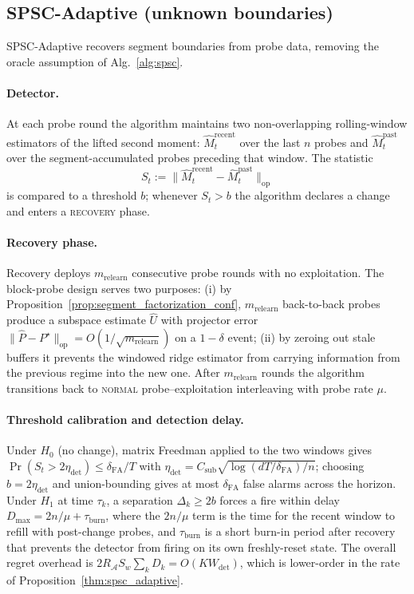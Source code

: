 \documentclass{article}
\newcommand{\op}{\mathrm{op}}
\newcommand{\cA}{\mathcal{A}}
\begin{document}
\subsection{SPSC-Adaptive (unknown boundaries)}
\label{app:alg_adaptive}

SPSC-Adaptive recovers segment boundaries from probe data, removing
the oracle assumption of Alg.~\ref{alg:spsc}.

\paragraph{Detector.}
At each probe round the algorithm maintains two non-overlapping
rolling-window estimators of the lifted second moment:
$\widehat M_t^{\mathrm{recent}}$ over the last $n$ probes and
$\widehat M_t^{\mathrm{past}}$ over the segment-accumulated probes
preceding that window. The statistic
\begin{equation}
S_t := \bigl\|\widehat M_t^{\mathrm{recent}} - \widehat M_t^{\mathrm{past}}\bigr\|_\op
\label{eq:detector}
\end{equation}
is compared to a threshold $b$; whenever $S_t > b$ the algorithm
declares a change and enters a \textsc{recovery} phase.

\paragraph{Recovery phase.}
Recovery deploys $m_{\mathrm{relearn}}$ consecutive probe rounds with
no exploitation. The block-probe design serves two purposes: (i) by
Proposition~\ref{prop:segment_factorization_conf}, $m_{\mathrm{relearn}}$
back-to-back probes produce a subspace estimate $\widehat U$ with
projector error
$\|\widehat P - P^\star\|_\op = O(1/\sqrt{m_{\mathrm{relearn}}})$ on a
$1-\delta$ event; (ii) by zeroing out stale buffers it prevents the
windowed ridge estimator from carrying information from the previous
regime into the new one. After $m_{\mathrm{relearn}}$ rounds the
algorithm transitions back to \textsc{normal} probe--exploitation
interleaving with probe rate $\mu$.

\paragraph{Threshold calibration and detection delay.}
Under $H_0$ (no change), matrix Freedman applied to the two windows
gives $\Pr(S_t > 2\eta_{\mathrm{det}}) \le \delta_{\mathrm{FA}}/T$ with
$\eta_{\mathrm{det}} = C_{\mathrm{sub}}\sqrt{\log(dT/\delta_{\mathrm{FA}})/n}$;
choosing $b = 2\eta_{\mathrm{det}}$ and union-bounding gives at most
$\delta_{\mathrm{FA}}$ false alarms across the horizon. Under $H_1$ at
time $\tau_k$, a separation $\Delta_k \ge 2b$ forces a fire within
delay $D_{\max} = 2n/\mu + \tau_{\mathrm{burn}}$, where the $2n/\mu$ term is
the time for the recent window to refill with post-change probes, and
$\tau_{\mathrm{burn}}$ is a short burn-in period after recovery that
prevents the detector from firing on its own freshly-reset state.
The overall regret overhead is $2R_\cA S_w\sum_k D_k = O(K
W_{\mathrm{det}})$, which is lower-order in the rate of
Proposition~\ref{thm:spsc_adaptive}.
\end{document}
